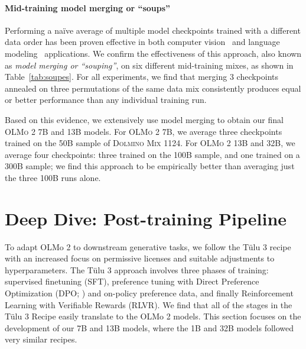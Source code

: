 \documentclass[table]{ai2style/ai2}
\newcommand{\tulu}{T\"ulu 3\xspace}
\newcommand{\olmotoo}{\textsc{OLMo 2}\xspace}
\newcommand{\dolminos}{\textsc{Dolmino Mix 1124}\xspace}
\newcommand{\divePost}{Post-training Pipeline}
\begin{document}
\paragraph{Mid-training model merging or ``soups''} 
Performing a na\"ive average of multiple model checkpoints trained with a different data order has been proven effective in both computer vision~\citep{modelsoups} and language modeling~\citep{dclm} applications. 
We confirm the effectiveness of this approach, also known as \textit{model merging or ``souping''}, on six different mid-training mixes, as shown in Table~\ref{tab:soupes}.
For all experiments, we find that merging 3 checkpoints annealed on three permutations of the same data mix consistently produces equal or better performance than any individual training run.

Based on this evidence, we extensively use model merging to obtain our final \olmotoo 7B and 13B models. 
For \olmotoo 7B, we average three checkpoints trained on the 50B sample of \dolminos.
For \olmotoo 13B and 32B, we average four checkpoints: three trained on the 100B sample, and one trained on a 300B sample;
we find this approach to be empirically better than averaging just the three 100B runs alone.

\section{Deep Dive: \divePost}
\label{sec:post-train}

To adapt OLMo 2 to downstream generative tasks, we follow the \tulu recipe~\citep{lambert2024tulu3} with an increased focus on permissive licenses and suitable adjustments to hyperparameters.
The \tulu approach involves three phases of training: supervised finetuning (SFT), preference tuning with Direct Preference Optimization (DPO; \citealp{rafailov2024direct}) and on-policy preference data, and finally Reinforcement Learning with Verifiable Rewards (RLVR).
We find that all of the stages in the \tulu Recipe easily translate to the OLMo 2 models.
This section focuses on the development of our 7B and 13B models, where the 1B and 32B models followed very similar recipes.
\end{document}
